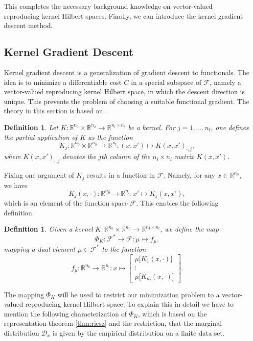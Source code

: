 \documentclass[11pt, a4paper]{article}
\newtheorem{definition}[theorem]{Definition}
\newcommand{\R}{\mathbb{R}}
\newcommand{\D}{\mathcal{D}}
\newcommand{\F}{\mathcal{F}}
\begin{document}
This completes the necessary background knowledge on vector-valued reproducing kernel Hilbert spaces. Finally, we can introduce the kernel gradient descent method.

\subsection{Kernel Gradient Descent} \label{sec:KGD}

Kernel gradient descent is a generalization of gradient descent to functionals. The idea is to minimize a differentiable cost $C$ in a special subspace of $\F$, namely a vector-valued reproducing kernel Hilbert space, in which the descent direction is unique. This prevents the problem of choosing a suitable functional gradient.
The theory in this section is based on \cite{NTK}.

\begin{definition}
Let $K: \R^{n_0} \times \R^{n_0} \to \R^{n_l \times n_l}$ be a kernel. For $j=1, \dots, n_l$, one defines the partial application of $K$ as the function
\[ K_j : \R^{n_0} \times \R^{n_0} \to \R^{n_l} : (x,x') \mapsto K(x,x')_{\cdot,j}, \]
where $K(x,x')_{\cdot,j}$ denotes the $j$th column of the $n_l \times n_l$ matrix $K(x,x')$.
\end{definition}

Fixing one argument of $K_j$ results in a function in $\F$. Namely, for any $x \in \R^{n_0}$, we have
\[ K_j(x,\cdot) : \R^{n_0} \to \R^{n_l} : x' \mapsto K_j(x,x'), \]
which is an element of the function space $\F$. This enables the following definition.

\begin{definition} \label{def:phi}
Given a kernel $K: \R^{n_0} \times \R^{n_0} \to \R^{n_l \times n_l}$, we define the map
\[ \Phi_K : \F^* \to \F : \mu \mapsto f_{\mu}, \]
mapping a dual element $\mu \in \F^*$ to the function
\[ f_{\mu} : \R^{n_0} \to \R^{n_l} : x \mapsto  \begin{bmatrix} \mu \big [K_1(x,\cdot) \big ] \\ \vdots \\ \mu \big [ K_{n_l}(x,\cdot) \big ] \end{bmatrix}. \]
\end{definition}

The mapping $\Phi_K$ will be used to restrict our minimization problem to a vector-valued reproducing kernel Hilbert space. To explain this in detail we have to mention the following characterization of $\Phi_K$, which is based on the representation theorem \ref{thm:riesz} and the restriction, that the marginal distribution $\D_x$ is given by the empirical distribution on a finite data set.
\end{document}
